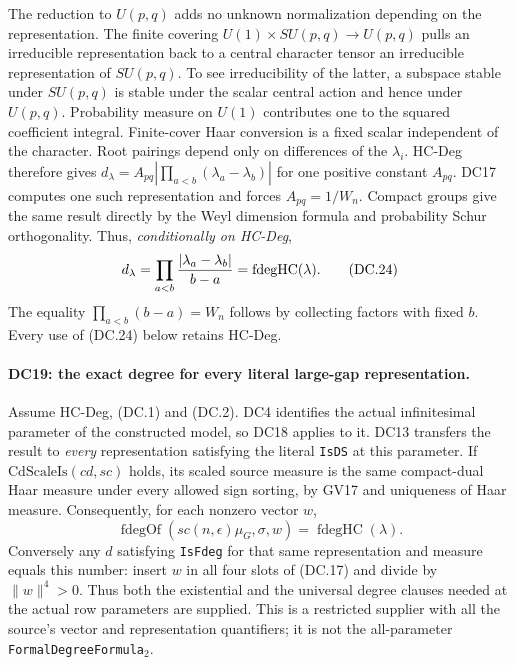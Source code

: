 The reduction to $U(p,q)$ adds no unknown normalization depending
on the representation.  The finite covering
$U(1)\times SU(p,q)\to U(p,q)$ pulls an irreducible representation
back to a central character tensor an irreducible representation
of $SU(p,q)$.  To see irreducibility of the latter, a subspace
stable under $SU(p,q)$ is stable under the scalar central action
and hence under $U(p,q)$.  Probability measure on $U(1)$ contributes
one to the squared coefficient integral.  Finite-cover Haar
conversion is a fixed scalar independent of the character.
Root pairings depend only on differences of the $\lambda_i$.
HC-Deg therefore gives
$d_\lambda=A_{pq}|\prod_{a<b}(\lambda_a-\lambda_b)|$ for one
positive constant $A_{pq}$.  DC17 computes one such representation
and forces $A_{pq}=1/W_n$.  Compact groups give the same result
directly by the Weyl dimension formula and probability Schur
orthogonality.  Thus, \emph{conditionally on HC-Deg},
\[
               d_\lambda=
            \prod_{a<b}{|\lambda_a-\lambda_b|\over b-a}
                    =\operatorname{fdegHC}(\lambda).          \tag{DC.24}
\]
The equality $\prod_{a<b}(b-a)=W_n$ follows by collecting factors
with fixed $b$.  Every use of (DC.24) below retains HC-Deg.

\paragraph{DC19: the exact degree for every literal large-gap representation.}
\label{claim:DC19}
Assume HC-Deg, (DC.1) and (DC.2).  DC4 identifies the actual
infinitesimal parameter of the constructed model, so DC18 applies
to it.  DC13 transfers the result to \emph{every} representation
satisfying the literal \texttt{IsDS} at this parameter.
If $\mathrm{CdScaleIs}(cd,sc)$ holds, its scaled source measure
is the same compact-dual Haar measure under every allowed sign
sorting, by GV17 and uniqueness of Haar measure.  Consequently,
for each nonzero vector $w$,
\[
 \operatorname{fdegOf}(sc(n,\epsilon)\mu_G,\sigma,w)
             =\operatorname{fdegHC}(\lambda).                 \tag{DC.25}
\]
Conversely any $d$ satisfying \texttt{IsFdeg} for that same
representation and measure equals this number: insert $w$ in
all four slots of (DC.17) and divide by $\|w\|^4>0$.
Thus both the existential and the universal degree clauses
needed at the actual row parameters are supplied.  This is a
restricted supplier with all the source's vector and representation
quantifiers; it is not the all-parameter \texttt{FormalDegreeFormula\(_2\)}.

